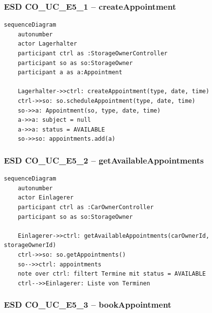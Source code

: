 \subsubsection*{ESD CO\_UC\_E5\_1 – createAppointment}

\begin{lstlisting}[basicstyle=\ttfamily\small, breaklines=true]
sequenceDiagram
    autonumber
    actor Lagerhalter
    participant ctrl as :StorageOwnerController
    participant so as so:StorageOwner
    participant a as a:Appointment

    Lagerhalter->>ctrl: createAppointment(type, date, time)
    ctrl->>so: so.scheduleAppointment(type, date, time)
    so->>a: Appointment(so, type, date, time)
    a->>a: subject = null
    a->>a: status = AVAILABLE
    so->>so: appointments.add(a)
\end{lstlisting}

\newpage

{}
\subsubsection*{ESD CO\_UC\_E5\_2 – getAvailableAppointments}

\begin{lstlisting}[basicstyle=\ttfamily\small, breaklines=true]
sequenceDiagram
    autonumber
    actor Einlagerer
    participant ctrl as :CarOwnerController
    participant so as so:StorageOwner

    Einlagerer->>ctrl: getAvailableAppointments(carOwnerId, storageOwnerId)
    ctrl->>so: so.getAppointments()
    so-->>ctrl: appointments
    note over ctrl: filtert Termine mit status = AVAILABLE
    ctrl-->>Einlagerer: Liste von Terminen
\end{lstlisting}

\newpage

{}
\subsubsection*{ESD CO\_UC\_E5\_3 – bookAppointment}

